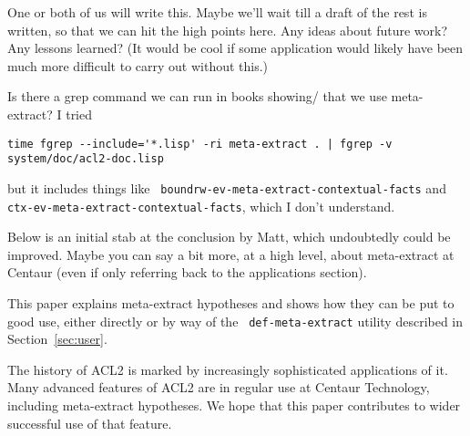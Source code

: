 \begin{mycomment}
 One or both of us will write this.  Maybe we'll wait
  till a draft of the rest is written, so that we can hit the high
  points here.  Any ideas about future work?  Any lessons learned?
  (It would be cool if some application would likely have been much
  more difficult to carry out without this.)
\end{mycomment}

\begin{mycomment}
Is there a grep command we can run in books showing/ that we use
    meta-extract?  I tried

\begin{verbatim}
time fgrep --include='*.lisp' -ri meta-extract . | fgrep -v system/doc/acl2-doc.lisp
\end{verbatim}

\noindent but it includes things like {\tt
boundrw-ev-meta-extract-contextual-facts} and {\tt
ctx-ev-meta-extract-contextual-facts}, which I don't understand.

Below is an initial stab at the conclusion by Matt, which undoubtedly
could be improved.  Maybe you can say a bit more, at a high level,
    about meta-extract at Centaur (even if only referring back to the
    applications section).
\end{mycomment}

This paper explains meta-extract hypotheses and shows how they can be
put to good use, either directly or by way of the {\tt
def-meta-extract} utility described in Section~\ref{sec:user}.

The history of ACL2 is marked by increasingly sophisticated
applications of it.  Many advanced features of ACL2 are in regular use
at Centaur Technology, including meta-extract hypotheses.  We hope
that this paper contributes to wider successful use of that feature.
